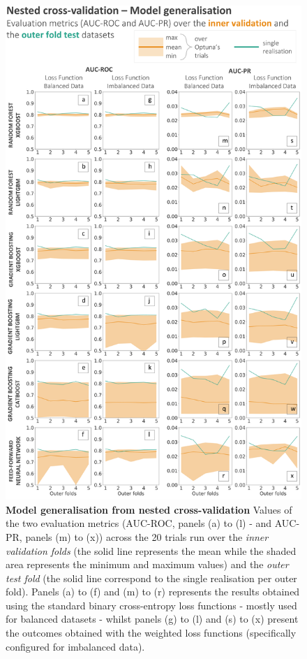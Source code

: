 \documentclass[nhess, manuscript]{copernicus}
\begin{document}
\begin{figure}[t]
\includegraphics[width=12cm]{figures/optuna_evaluation_metrics.png}
\caption{\textbf{Model generalisation from nested cross-validation} Values of the two evaluation metrics (AUC-ROC, panels (a) to (l) - and AUC-PR, panels (m) to (x)) across the 20 trials run over the \textit{inner validation folds} (the solid line represents the mean while the shaded area represents the minimum and maximum values) and the \textit{outer test fold} (the solid line correspond to the single realisation per outer fold). Panels (a) to (f) and (m) to (r) represents the results obtained using the standard binary cross-entropy loss functions - mostly used for balanced datasets - whilst panels (g) to (l) and (s) to (x) present the outcomes obtained with the weighted loss functions (specifically configured for imbalanced data).}
\label{fig:optuna_evaluation_metrics}
\end{figure}
\end{document}
